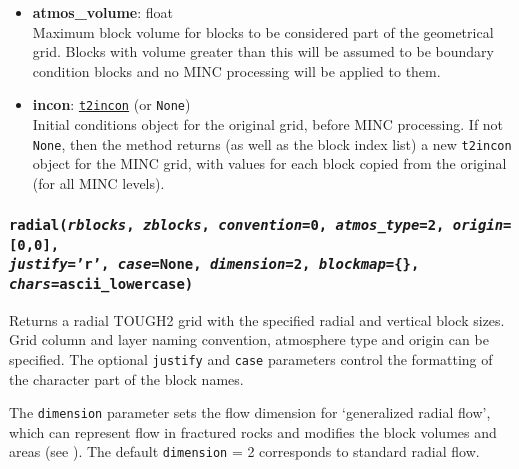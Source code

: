 \begin{itemize}
\item \textbf{atmos\_volume}: float\\
  Maximum block volume for blocks to be considered part of the geometrical grid. Blocks with volume greater than this will be assumed to be boundary condition blocks and no MINC processing will be applied to them.
\item \textbf{incon}: \hyperref[incons]{\texttt{t2incon}} (or \texttt{None})\\
  Initial conditions object for the original grid, before MINC processing. If not \texttt{None}, then the method returns (as well as the block index list) a new \texttt{t2incon} object for the MINC grid, with values for each block copied from the original (for all MINC levels).
\end{itemize}


\begin{snugshade}
\subsubsection{\texttt{radial(\emph{rblocks}, \emph{zblocks}, \emph{convention}=0, \emph{atmos\_type}=2, \emph{origin}=[0,0],\\
    \emph{justify}='r', \emph{case}=None, \emph{dimension}=2, \emph{blockmap}=\{\}, \emph{chars}=ascii\_lowercase)}}
\end{snugshade}
\label{sec:t2grid:radial}

Returns a radial TOUGH2 grid with the specified radial and vertical block sizes.  Grid column and layer naming convention, atmosphere type and origin can be specified.  The optional \texttt{justify} and \texttt{case} parameters control the formatting of the character part of the block names.

The \texttt{dimension} parameter sets the flow dimension for `generalized radial flow', which can represent flow in fractured rocks and modifies the block volumes and areas (see \cite{barker_1988}).  The default \texttt{dimension} = 2 corresponds to standard radial flow.

